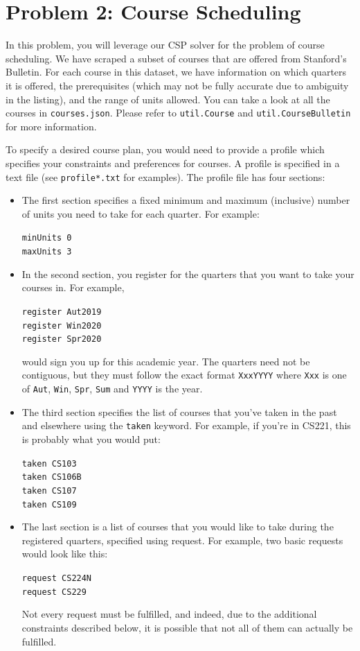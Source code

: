 \documentclass{article}
\theoremstyle{case}
\theoremstyle{definition}
\begin{document}
\newpage
\section*{Problem 2: Course Scheduling}
In this problem, you will leverage our CSP solver for the problem of course scheduling. We have scraped a subset of courses that are offered from Stanford's Bulletin. For each course in this dataset, we have information on which quarters it is offered, the prerequisites (which may not be fully accurate due to ambiguity in the listing), and the range of units allowed. You can take a look at all the courses in \texttt{courses.json}. Please refer to \texttt{util.Course} and \texttt{util.CourseBulletin} for more information. 

To specify a desired course plan, you would need to provide a profile which specifies your constraints and preferences for courses. A profile is specified in a text file (see \texttt{profile*.txt} for examples). The profile file has four sections:
\begin{itemize}
\item
	The first section specifies a fixed minimum and maximum (inclusive) number of units you need to take for each quarter. For example:
	
	\texttt{minUnits 0\\ maxUnits 3}
\item
	In the second section, you register for the quarters that you want to take your courses in. For example, 
	
	\texttt{register Aut2019\\
register Win2020\\
register Spr2020}

would sign you up for this academic year. The quarters need not be contiguous, but they must follow the exact format \texttt{XxxYYYY} where \texttt{Xxx} is one of \texttt{Aut}, \texttt{Win}, \texttt{Spr}, \texttt{Sum} and \texttt{YYYY} is the year.
\item
	The third section specifies the list of courses that you've taken in the past and elsewhere using the \texttt{taken} keyword. For example, if you're in CS221, this is probably what you would put:
	
	\texttt{taken CS103\\
taken CS106B\\
taken CS107\\
taken CS109}
\item
	The last section is a list of courses that you would like to take during the registered quarters, specified using request. For example, two basic requests would look like this:
	
	\texttt{request CS224N\\
request CS229}

Not every request must be fulfilled, and indeed, due to the additional constraints described below, it is possible that not all of them can actually be fulfilled. 
\end{itemize}
\end{document}
